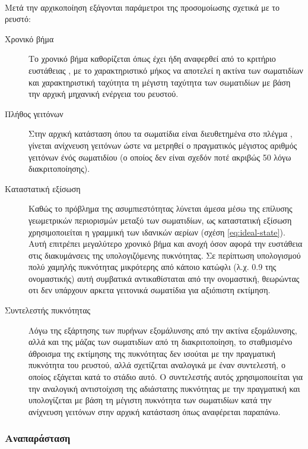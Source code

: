 \paragraph{} Μετά την αρχικοποίηση εξάγονται παράμετροι της προσομοίωσης σχετικά με το
ρευστό:
\begin{description}
\item[Χρονικό βήμα] Το χρονικό βήμα καθορίζεται όπως έχει ήδη αναφερθεί από το κριτήριο
  ευστάθειας , με το χαρακτηριστικό μήκος να αποτελεί η ακτίνα των σωματιδίων και
  χαρακτηριστική ταχύτητα τη μέγιστη ταχύτητα των σωματιδίων με βάση την αρχική μηχανική
  ενέργεια του ρευστού.
\item[Πλήθος γειτόνων] Στην αρχική κατάσταση όπου τα σωματίδια είναι διευθετημένα στο
  πλέγμα , γίνεται ανίχνευση γειτόνων ώστε να μετρηθεί ο πραγματικός μέγιστος
  αριθμός γειτόνων ένός σωματιδίου (ο οποίος δεν είναι σχεδόν ποτέ ακριβώς 50 λόγω
  διακριτοποίησης).
\item[Καταστατική εξίσωση] Καθώς το πρόβλημα της ασυμπιεστότητας λύνεται άμεσα μέσω της
  επίλυσης γεωμετρικών περιορισμών μεταξύ των σωματιδίων, ως καταστατική εξίσωση
  χρησιμοποιείται η γραμμική των ιδανικών αερίων (σχέση \ref{eq:ideal-state}). Αυτή
  επιτρέπει μεγαλύτερο χρονικό βήμα και ανοχή όσον αφορά την ευστάθεια στις διακυμάνσεις
  της υπολογιζόμενης πυκνότητας. Σε περίπτωση υπολογισμού πολύ χαμηλής πυκνότητας
  μικρότερης από κάποιο κατώφλι (λ.χ. 0.9 της ονομαστικής) αυτή συμβατικά αντικαθίσταται
  από την ονομαστική, θεωρώντας οτι δεν υπάρχουν αρκετα γειτονικά σωματίδια για αξιόπιστη
  εκτίμηση.
\item[Συντελεστής πυκνότητας] Λόγω της εξάρτησης των πυρήνων εξομάλυνσης από την ακτίνα
  εξομάλυνσης, αλλά και της μάζας των σωματιδίων από τη διακριτοποίηση, το σταθμισμένο
  άθροισμα της εκτίμησης της πυκνότητας δεν ισούται με την πραγματική πυκνότητα του
  ρευστού, αλλά σχετίζεται αναλογικά με έναν συντελεστή, ο οποίος εξάγεται κατά το στάδιο
  αυτό. Ο συντελεστής αυτός χρησιμοποιείται για την αναλογική αντιστοίχιση της αδιάστατης
  πυκνότητας με την πραγματική και υπολογίζεται με βάση τη μέγιστη πυκνότητα των
  σωματιδίων κατά την ανίχνευση γειτόνων στην αρχική κατάσταση όπως αναφέρεται παραπάνω.
\end{description}

\subsubsection{Αναπαράσταση}
\label{sssec:lp-grid-representation}
